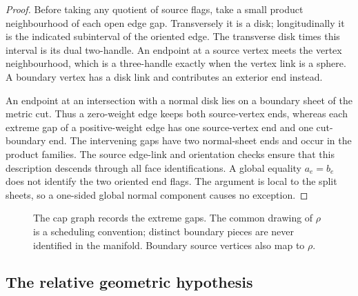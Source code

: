 \begin{proof}
Before taking any quotient of source flags, take a small product
neighbourhood of each open edge gap. Transversely it is a disk; longitudinally
it is the indicated subinterval of the oriented edge. The transverse disk
times this interval is its dual two-handle. An endpoint at a source vertex
meets the vertex neighbourhood, which is a three-handle exactly when the
vertex link is a sphere. A boundary vertex has a disk link and contributes
an exterior end instead.

An endpoint at an intersection with a normal disk lies on a boundary sheet
of the metric cut. Thus a zero-weight edge keeps both source-vertex ends,
whereas each extreme gap of a positive-weight edge has one source-vertex end
and one cut-boundary end. The intervening gaps have two normal-sheet ends
and occur in the product families. The source edge-link and orientation
checks ensure that this description descends through all face identifications.
A global equality $a_e=b_e$ does not identify the two oriented end flags.
The argument is local to the split sheets, so a one-sided global normal
component causes no exception.
\end{proof}

\begin{figure}[htbp]
\centering
{}
\caption{The cap graph records the extreme gaps. The common drawing of
 $\rho$ is a scheduling convention; distinct boundary pieces are never
 identified in the manifold. Boundary source vertices also map to $\rho$.}
\label{fig:caps}
\end{figure}

\subsection{The relative geometric hypothesis}

